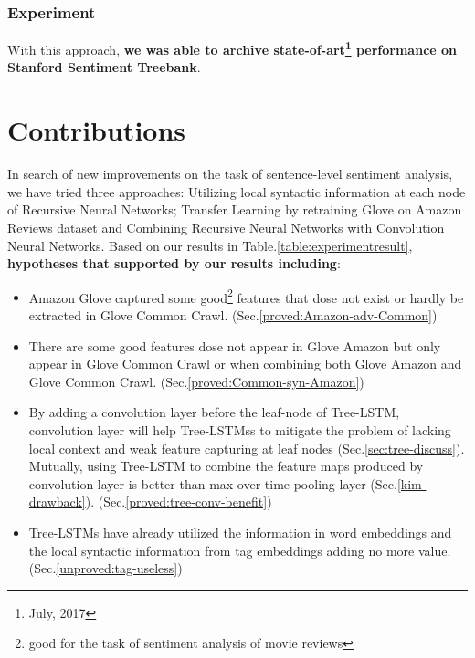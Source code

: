 \subsubsection{Experiment}
With this approach, \textbf{we was able to archive state-of-art\footnote{July, 2017} performance on Stanford Sentiment Treebank}.


\section{Contributions}
In search of new improvements on the task of sentence-level sentiment analysis, we have tried three approaches: Utilizing local syntactic information at each node of Recursive Neural Networks; Transfer Learning by retraining Glove on Amazon Reviews dataset and Combining Recursive Neural Networks with Convolution Neural Networks.
Based on our results in Table.\ref{table:experimentresult}, \textbf{hypotheses that supported by our results including}:
\begin{itemize}
\item Amazon Glove captured some good\footnote{good for the task of sentiment analysis of movie reviews} features that dose not exist or hardly be extracted in Glove Common Crawl. (Sec.\ref{proved:Amazon-adv-Common})

\item There are some good features dose not appear in Glove Amazon but only appear in Glove Common Crawl or when combining both Glove Amazon and Glove Common Crawl. (Sec.\ref{proved:Common-syn-Amazon})

\item By adding a convolution layer before the leaf-node of Tree-LSTM, convolution layer will help Tree-LSTMss to mitigate the problem of lacking local context and weak feature capturing at leaf nodes (Sec.\ref{sec:tree-discuss}).
Mutually, using Tree-LSTM to combine the feature maps produced by convolution layer is better than max-over-time pooling layer (Sec.\ref{kim-drawback}). (Sec.\ref{proved:tree-conv-benefit})

\item  Tree-LSTMs have already utilized the information in word embeddings and the local syntactic information from tag embeddings adding no more value. (Sec.\ref{unproved:tag-useless})
\end{itemize}


